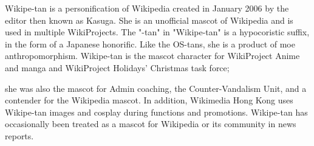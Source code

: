 Wikipe-tan  is a personification of Wikipedia created in January 2006 by the editor then known as Kasuga.
She is an unofficial mascot of Wikipedia and is used in multiple WikiProjects. The "-tan" in "Wikipe-tan" 
is a hypocoristic suffix, in the form of a Japanese honorific. Like the OS-tans, she is a product of moe anthropomorphism.
Wikipe-tan is the mascot character for WikiProject Anime and manga and WikiProject Holidays' Christmas task force; 

she was also the mascot for Admin coaching, the Counter-Vandalism Unit, and a contender for the Wikipedia mascot. 
In addition, Wikimedia Hong Kong uses Wikipe-tan images and cosplay during functions and promotions. Wikipe-tan 
has occasionally been treated as a mascot for Wikipedia or its community in news reports.


